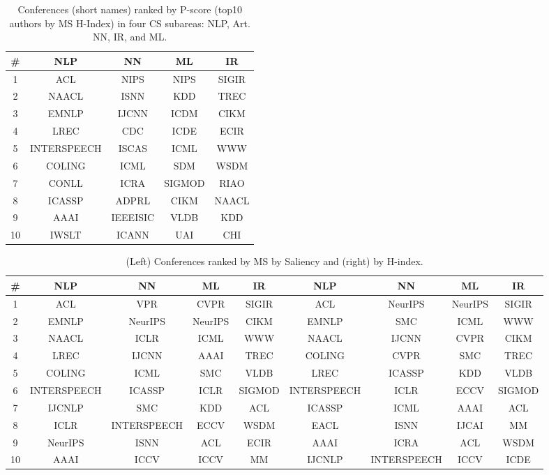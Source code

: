 \documentclass[notitlepage]{svjour3}
\begin{document}
\begin{table}[ht!]
  \small
  \centering
  \begin{tabular}{c c c c c} 
  \toprule
  \# & NLP & NN & ML & IR  \\ 
  \midrule
  1  & ACL & NIPS & NIPS & SIGIR \\
  2  & NAACL & ISNN & KDD & TREC \\
  3  & EMNLP & IJCNN & ICDM & CIKM \\
  4  & LREC & CDC & ICDE & ECIR \\
  5  & INTERSPEECH & ISCAS & ICML & WWW \\
  6  & COLING & ICML & SDM & WSDM \\
  7  & CONLL & ICRA & SIGMOD & RIAO \\
  8  & ICASSP & ADPRL & CIKM & NAACL \\
  9  & AAAI & IEEEISIC & VLDB & KDD \\
  10 & IWSLT & ICANN & UAI & CHI \\
  \bottomrule
  \end{tabular}
  \caption{Conferences (short names) ranked by P-score (top10 authors by MS H-Index) in four CS subareas: NLP, Art. NN, IR, and ML.}
  \label{tab:subareas-hindex}
\end{table}


\begin{table}[ht!]
  \small
  \centering
  \begin{tabular}{c c c c c | c c c c} 
  \toprule
  \# & NLP & NN & ML & IR & NLP & NN & ML & IR \\ 
  \midrule
  1  & ACL	&	VPR	&	CVPR	&	SIGIR	&	ACL	&	NeurIPS	&	NeurIPS	&	SIGIR\\
  2  & EMNLP	&	NeurIPS	&	NeurIPS	&	CIKM	&	EMNLP	&	SMC	&	ICML	&	WWW\\
  3  & NAACL	&	ICLR	&	ICML	&	WWW	&	NAACL	&	IJCNN	&	CVPR	&	CIKM\\
  4  & LREC	&	IJCNN	&	AAAI	&	TREC	&	COLING	&	CVPR	&	SMC	&	TREC\\
  5  & COLING	&	ICML	&	SMC	&	VLDB	&	LREC	&	ICASSP	&	KDD	&	VLDB\\
  6  & INTERSPEECH	&	ICASSP	&	ICLR	&	SIGMOD	&	INTERSPEECH	&	ICLR	&	ECCV	&	SIGMOD\\
  7  & IJCNLP	&	SMC	&	KDD	&	ACL	&	ICASSP	&	ICML	&	AAAI	&	ACL\\
  8  & ICLR	&	INTERSPEECH	&	ECCV	&	WSDM	&	EACL	&	ISNN	&	IJCAI	&	MM\\
  9  & NeurIPS	&	ISNN	&	ACL	&	ECIR	&	AAAI	&	ICRA	&	ACL	&	WSDM\\
  10 & AAAI	&	ICCV	&	ICCV	&	MM	&	IJCNLP	&	INTERSPEECH	&	ICCV	&	ICDE\\
  \bottomrule
  \end{tabular}
  \caption{(Left) Conferences ranked by MS by Saliency and (right) by H-index.}
  \label{tab:subareas-hindex}
\end{table}
\end{document}
